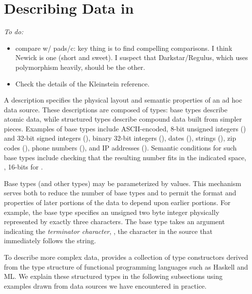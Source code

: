 \newcommand{\pvalue}{???}
\section{Describing Data in \padsmlbig{}}
\label{sec:padsml-overview}

{\em
To do:
\begin{itemize}
\item compare w/ pads/c: key thing is to find compelling
  comparisons. I think Newick is one (short and sweet). I suspect that
  Darkstar/Regulus, which uses polymorphism heavily, should be the
  other.
\item Check the details of the Kleinstein reference.
\end{itemize}
}

A \padsml{} description specifies the physical layout and semantic
properties of an ad hoc data source.  These descriptions are composed
of types: base types describe atomic data, while structured types
describe compound data built from simpler pieces.  Examples of base
types include ASCII-encoded, 8-bit unsigned integers () and
32-bit signed integers (), binary 32-bit integers (),
dates (), strings (), zip codes (),
phone numbers (), and IP addresses ().  Semantic
conditions for such base types include checking 
that the resulting number fits in the indicated space, \ie, 16-bits
for .

Base types (and other types) may be parameterized by \ml{} values. 
This mechanism serves both to reduce the number of base types
and to permit the format and properties of later portions of the data
to depend upon earlier portions.  For example, the base type
 specifies an unsigned two byte integer physically
represented by exactly three characters. The base type 
takes an argument indicating the \textit{terminator character}, \ie{},
the character in the source that immediately follows the string.

To describe more complex data, \padsml{} provides a collection of
type constructors derived from the type structure of functional
programming languages such as Haskell and ML.  We explain these
structured types in the following subsections using examples drawn
from data sources we have encountered in practice. 


